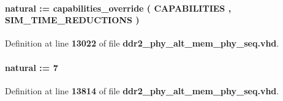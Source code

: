 \paragraph[{c\+\_\+capabilities\+\_\+override}]{ {\bfseries \textcolor{comment}{natural}\textcolor{vhdlchar}{ }\textcolor{vhdlchar}{ }\textcolor{vhdlchar}{\+:}\textcolor{vhdlchar}{=}\textcolor{vhdlchar}{ }\textcolor{vhdlchar}{ }\textcolor{vhdlchar}{ }\textcolor{vhdlchar}{ }\textcolor{vhdlchar}{capabilities\+\_\+override}\textcolor{vhdlchar}{ }\textcolor{vhdlchar}{(}\textcolor{vhdlchar}{ }\textcolor{vhdlchar}{ }\textcolor{vhdlchar}{ }\textcolor{vhdlchar}{ }{\bfseries {\bf C\+A\+P\+A\+B\+I\+L\+I\+T\+I\+ES}} \textcolor{vhdlchar}{ }\textcolor{vhdlchar}{,}\textcolor{vhdlchar}{ }\textcolor{vhdlchar}{ }\textcolor{vhdlchar}{ }\textcolor{vhdlchar}{ }{\bfseries {\bf S\+I\+M\+\_\+\+T\+I\+M\+E\+\_\+\+R\+E\+D\+U\+C\+T\+I\+O\+NS}} \textcolor{vhdlchar}{ }\textcolor{vhdlchar}{)}\textcolor{vhdlchar}{ }} \hspace{0.3cm}{\ttfamily [Constant]}}\label{classddr2__phy__alt__mem__phy__seq_1_1struct_a1e580de0b5e5766e2c18266cef4b7da0}


Definition at line {\bf 13022} of file {\bf ddr2\+\_\+phy\+\_\+alt\+\_\+mem\+\_\+phy\+\_\+seq.\+vhd}.

\paragraph[{c\+\_\+dly\+\_\+poa\+\_\+set}]{ {\bfseries \textcolor{comment}{natural}\textcolor{vhdlchar}{ }\textcolor{vhdlchar}{ }\textcolor{vhdlchar}{\+:}\textcolor{vhdlchar}{=}\textcolor{vhdlchar}{ }\textcolor{vhdlchar}{ } \textcolor{vhdldigit}{7} \textcolor{vhdlchar}{ }} \hspace{0.3cm}{\ttfamily [Constant]}}\label{classddr2__phy__alt__mem__phy__seq_1_1struct_aeae54d429132a90b0be695f4aabf0a2d}


Definition at line {\bf 13814} of file {\bf ddr2\+\_\+phy\+\_\+alt\+\_\+mem\+\_\+phy\+\_\+seq.\+vhd}.

